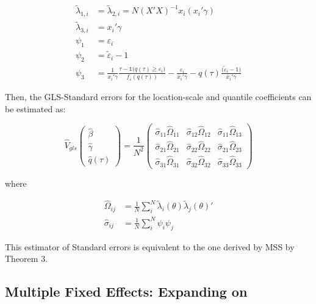 \documentclass[
  authoryear,
  review,
  1p]{elsarticle}
\begin{document}
\[\begin{aligned}
\tilde \lambda_{1,i}&=\tilde \lambda_{2,i}=N (X'X)^{-1}  x_i ( x_i'\gamma) \\  
\tilde \lambda_{3,i}&=x_i' \gamma  \\
 \psi_1 &= \varepsilon_i \\
 \psi_2 &= \tilde \varepsilon_i -1 \\
 \psi_3 &= \frac{1}{ x_i' \gamma }\frac{\tau-\mathbb{1}\big( q(\tau)  \geq \varepsilon_i  \big) }{ f_{\varepsilon}(q(\tau))} - \frac{\varepsilon_i }{\bar x_i'\gamma} 
-  q(\tau) \frac{(\tilde \varepsilon_i -1\big)}{\bar x_i'\gamma}
\end{aligned}
\]

Then, the GLS-Standard errors for the location-scale and quantile
coefficients can be estimated as:

\[\hat{V}_{gls}
  \begin{pmatrix}
  \hat\beta \\
  \hat\gamma \\
  \hat q(\tau)
  \end{pmatrix}
 = \frac{1}{N^2} 
 \begin{pmatrix}
 \hat\sigma_{11} \hat\Omega_{11} & \hat\sigma_{12} \hat\Omega_{12} & \hat\sigma_{11} \hat\Omega_{13} \\
 \hat\sigma_{21} \hat\Omega_{21} & \hat\sigma_{22} \hat\Omega_{22} & \hat\sigma_{21} \hat\Omega_{23} \\
 \hat\sigma_{31} \hat\Omega_{31} & \hat\sigma_{32} \hat\Omega_{32} & \hat\sigma_{33} \hat\Omega_{33}
  \end{pmatrix}
\]

where

\[\begin{aligned}
\hat\Omega_{ij} &= \frac{1}{N} \sum_i^N \tilde \lambda_{i}(\theta) \tilde \lambda_{j}(\theta)' \\
\hat\sigma_{ij} &= \frac{1}{N} \sum_i^N \psi_{i} \psi_{j}
\end{aligned}
\]

This estimator of Standard errors is equivalent to the one derived by
MSS by Theorem 3.

\subsection{\texorpdfstring{Multiple Fixed Effects: Expanding on
\citet{mss2019}}{Multiple Fixed Effects: Expanding on @mss2019}}\label{multiple-fixed-effects-expanding-on-mss2019}
\end{document}
